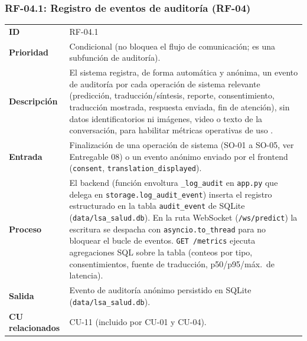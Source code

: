 \subsubsection{RF-04.1: Registro de eventos de auditoría (RF-04)}
\begin{table}[H]
\centering
\begin{tabularx}{\textwidth}{l X}
\toprule
\textbf{ID} & RF-04.1 \\
\textbf{Prioridad} & Condicional (no bloquea el flujo de comunicación; es una subfunción de auditoría). \\
\textbf{Descripción} & El sistema registra, de forma automática y anónima, un evento de auditoría por cada operación de sistema relevante (predicción, traducción/síntesis, reporte, consentimiento, traducción mostrada, respuesta enviada, fin de atención), sin datos identificatorios ni imágenes, video o texto de la conversación, para habilitar métricas operativas de uso . \\
\textbf{Entrada} & Finalización de una operación de sistema (SO-01 a SO-05, ver Entregable 08) o un evento anónimo enviado por el frontend (\texttt{consent}, \texttt{translation\_displayed}). \\
\textbf{Proceso} & El backend (función envoltura \texttt{\_log\_audit} en \texttt{app.py} que delega en \texttt{storage.log\_audit\_event}) inserta el registro estructurado en la tabla \texttt{audit\_event} de SQLite (\texttt{data/lsa\_salud.db}). En la ruta WebSocket (\texttt{/ws/predict}) la escritura se despacha con \texttt{asyncio.to\_thread} para no bloquear el bucle de eventos. \texttt{GET /metrics} ejecuta agregaciones SQL sobre la tabla (conteos por tipo, consentimientos, fuente de traducción, p50/p95/máx.\ de latencia). \\
\textbf{Salida} & Evento de auditoría anónimo persistido en SQLite (\texttt{data/lsa\_salud.db}). \\
\textbf{CU relacionados} & CU-11 (incluido por CU-01 y CU-04). \\
\bottomrule
\end{tabularx}
\end{table}

